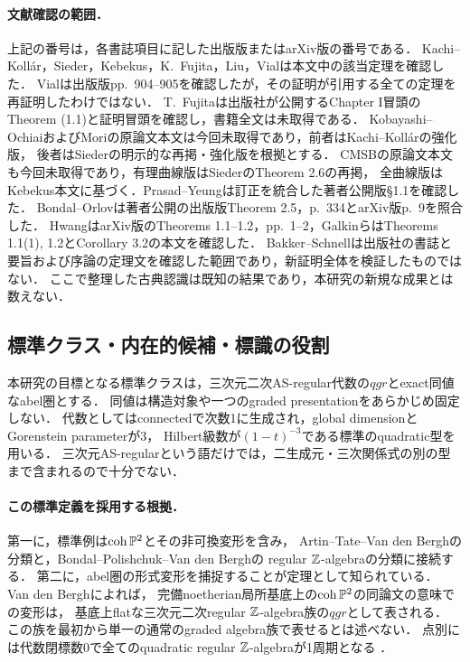 \documentclass[11pt,a4paper]{ltjsarticle}
\begin{document}
\paragraph{文献確認の範囲．}
上記の番号は，各書誌項目に記した出版版またはarXiv版の番号である．
Kachi--Koll\'ar，Sieder，Kebekus，K.~Fujita，Liu，Vialは本文中の該当定理を確認した．
Vialは出版版pp.~904--905を確認したが，その証明が引用する全ての定理を再証明したわけではない．
T.~Fujitaは出版社が公開するChapter I冒頭のTheorem (1.1)と証明冒頭を確認し，書籍全文は未取得である．
Kobayashi--OchiaiおよびMoriの原論文本文は今回未取得であり，前者はKachi--Koll\'arの強化版，
後者はSiederの明示的な再掲・強化版を根拠とする．
CMSBの原論文本文も今回未取得であり，有理曲線版はSiederのTheorem 2.6の再掲，
全曲線版はKebekus本文に基づく．Prasad--Yeungは訂正を統合した著者公開版\S1.1を確認した．
Bondal--Orlovは著者公開の出版版Theorem 2.5，p.~334とarXiv版p.~9を照合した．
HwangはarXiv版のTheorems 1.1--1.2，pp.~1--2，GalkinらはTheorems 1.1(1), 1.2とCorollary 3.2の本文を確認した．
Bakker--Schnellは出版社の書誌と要旨および序論の定理文を確認した範囲であり，新証明全体を検証したものではない．
ここで整理した古典認識は既知の結果であり，本研究の新規な成果とは数えない．


\subsection{標準クラス・内在的候補・標識の役割}
\label{subsec:v9-definition-comparison}
本研究の目標となる標準クラスは，三次元二次AS-regular代数の$qgr$とexact同値なabel圏とする．
同値は構造対象や一つのgraded presentationをあらかじめ固定しない．
代数としてはconnectedで次数1に生成され，global dimensionとGorenstein parameterが3，
Hilbert級数が$(1-t)^{-3}$である標準のquadratic型を用いる．
三次元AS-regularという語だけでは，二生成元・三次関係式の別の型まで含まれるので十分でない．

\paragraph{この標準定義を採用する根拠．}
第一に，標準例は$\operatorname{coh}\mathbb P^2$とその非可換変形を含み，
Artin--Tate--Van den Berghの分類と，Bondal--Polishchuk--Van den Berghの
regular $\mathbb Z$-algebraの分類に接続する．
第二に，abel圏の形式変形を捕捉することが定理として知られている．
Van den Bergh\cite[Definition 8.1, Theorem 8.1.1]{VdBquad}によれば，
完備noetherian局所基底上の$\operatorname{coh}\mathbb P^2$の同論文の意味での変形は，
基底上flatな三次元二次regular $\mathbb Z$-algebra族の$qgr$として表される．
この族を最初から単一の通常のgraded algebra族で表せるとは述べない．
点別には代数閉標数0で全てのquadratic regular $\mathbb Z$-algebraが1周期となる
\cite[Theorem 4.2.2]{VdBquad}．
\end{document}
